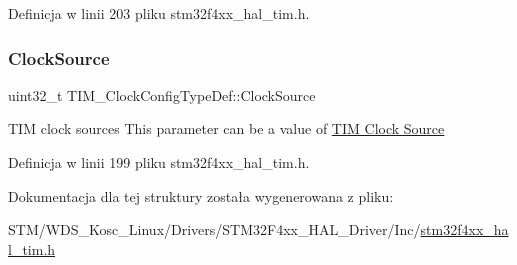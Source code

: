 Definicja w linii 203 pliku stm32f4xx\+\_\+hal\+\_\+tim.\+h.

\mbox{\label{struct_t_i_m___clock_config_type_def_a54c329013b5f6f87d1c3d2495fca84d2}} 
\subsubsection{\texorpdfstring{Clock\+Source}{ClockSource}}
{\footnotesize\ttfamily uint32\+\_\+t T\+I\+M\+\_\+\+Clock\+Config\+Type\+Def\+::\+Clock\+Source}

T\+IM clock sources This parameter can be a value of \hyperlink{group___t_i_m___clock___source}{T\+IM Clock Source} 

Definicja w linii 199 pliku stm32f4xx\+\_\+hal\+\_\+tim.\+h.



Dokumentacja dla tej struktury została wygenerowana z pliku\+:\begin{DoxyCompactItemize}
\item 
S\+T\+M/\+W\+D\+S\+\_\+\+Kosc\+\_\+\+Linux/\+Drivers/\+S\+T\+M32\+F4xx\+\_\+\+H\+A\+L\+\_\+\+Driver/\+Inc/\hyperlink{stm32f4xx__hal__tim_8h}{stm32f4xx\+\_\+hal\+\_\+tim.\+h}\end{DoxyCompactItemize}

